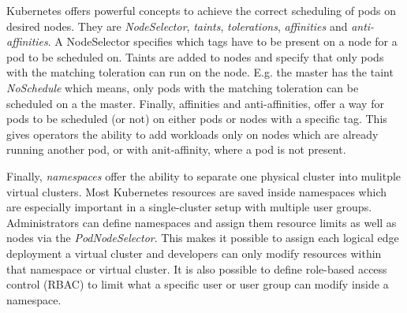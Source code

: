 Kubernetes offers powerful concepts to achieve the correct scheduling of pods on desired nodes. They are \textit{NodeSelector}, \textit{taints}, \textit{tolerations}, \textit{affinities} and \textit{anti-affinities}. A NodeSelector specifies which tags have to be present on a node for a pod to be scheduled on. Taints are added to nodes and specify that only pods with the matching toleration can run on the node. E.g. the master has the taint \textit{NoSchedule} which means, only pods with the matching toleration can be scheduled on a the master. Finally, affinities and anti-affinities, offer a way for pods to be scheduled (or not) on either pods or nodes with a specific tag. This gives operators the ability to add workloads only on nodes which are already running another pod, or with anit-affinity, where a pod is not present. 

Finally, \textit{namespaces} offer the ability to separate one physical cluster into mulitple virtual clusters. Most Kubernetes resources are saved inside namespaces which are especially important in a single-cluster setup with multiple user groups. Administrators can define namespaces and assign them resource limits as well as nodes via the \textit{PodNodeSelector}. This makes it possible to assign each logical edge deployment a virtual cluster and developers can only modify resources within that namespace or virtual cluster. It is also possible to define role-based access control (RBAC) to limit what a specific user or user group can modify inside a namespace. 

